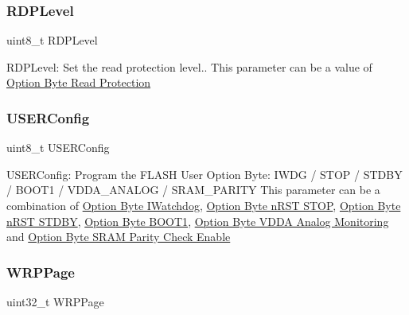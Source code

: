 \subsubsection{\texorpdfstring{R\+D\+P\+Level}{RDPLevel}}
{\footnotesize\ttfamily uint8\+\_\+t R\+D\+P\+Level}

R\+D\+P\+Level\+: Set the read protection level.. This parameter can be a value of \hyperlink{group___f_l_a_s_h_ex___o_b___read___protection}{Option Byte Read Protection} \mbox{\label{struct_f_l_a_s_h___o_b_program_init_type_def_ac4ab84c90f7a878b0b39ec1f3dda8ded}} 
\subsubsection{\texorpdfstring{U\+S\+E\+R\+Config}{USERConfig}}
{\footnotesize\ttfamily uint8\+\_\+t U\+S\+E\+R\+Config}

U\+S\+E\+R\+Config\+: Program the F\+L\+A\+SH User Option Byte\+: I\+W\+DG / S\+T\+OP / S\+T\+D\+BY / B\+O\+O\+T1 / V\+D\+D\+A\+\_\+\+A\+N\+A\+L\+OG / S\+R\+A\+M\+\_\+\+P\+A\+R\+I\+TY This parameter can be a combination of \hyperlink{group___f_l_a_s_h_ex___o_b___i_watchdog}{Option Byte I\+Watchdog}, \hyperlink{group___f_l_a_s_h_ex___o_b__n_r_s_t___s_t_o_p}{Option Byte n\+R\+ST S\+T\+OP}, \hyperlink{group___f_l_a_s_h_ex___o_b__n_r_s_t___s_t_d_b_y}{Option Byte n\+R\+ST S\+T\+D\+BY}, \hyperlink{group___f_l_a_s_h_ex___o_b___b_o_o_t1}{Option Byte B\+O\+O\+T1}, \hyperlink{group___f_l_a_s_h_ex___o_b___v_d_d_a___analog___monitoring}{Option Byte V\+D\+DA Analog Monitoring} and \hyperlink{group___f_l_a_s_h_ex___o_b___r_a_m___parity___check___enable}{Option Byte S\+R\+AM Parity Check Enable} \mbox{\label{struct_f_l_a_s_h___o_b_program_init_type_def_ae5bf1ca4800efd0ac1f1663a4778766b}} 
\subsubsection{\texorpdfstring{W\+R\+P\+Page}{WRPPage}}
{\footnotesize\ttfamily uint32\+\_\+t W\+R\+P\+Page}

